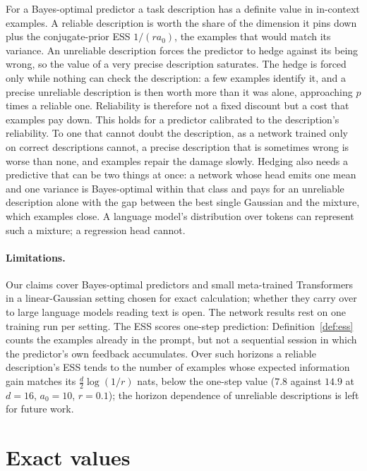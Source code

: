 \documentclass[10pt]{article}
\begin{document}
For a Bayes-optimal predictor a task description has a definite value in in-context examples. A reliable description is worth the share of the dimension it pins down plus the conjugate-prior ESS $1/(r a_0)$, the examples that would match its variance. An unreliable description forces the predictor to hedge against its being wrong, so the value of a very precise description saturates. The hedge is forced only while nothing can check the description: a few examples identify it, and a precise unreliable description is then worth more than it was alone, approaching $p$ times a reliable one. Reliability is therefore not a fixed discount but a cost that examples pay down. This holds for a predictor calibrated to the description's reliability. To one that cannot doubt the description, as a network trained only on correct descriptions cannot, a precise description that is sometimes wrong is worse than none, and examples repair the damage slowly. Hedging also needs a predictive that can be two things at once: a network whose head emits one mean and one variance is Bayes-optimal within that class and pays for an unreliable description alone with the gap between the best single Gaussian and the mixture, which examples close. A language model's distribution over tokens can represent such a mixture; a regression head cannot.

\paragraph{Limitations.}
Our claims cover Bayes-optimal predictors and small meta-trained Transformers in a linear-Gaussian setting chosen for exact calculation; whether they carry over to large language models reading text is open. The network results rest on one training run per setting. The ESS scores one-step prediction: Definition~\ref{def:ess} counts the examples already in the prompt, but not a sequential session in which the predictor's own feedback accumulates. Over such horizons a reliable description's ESS tends to the number of examples whose expected information gain matches its $\tfrac{d}{2}\log(1/r)$ nats, below the one-step value ($7.8$ against $14.9$ at $d = 16$, $a_0 = 10$, $r = 0.1$); the horizon dependence of unreliable descriptions is left for future work.




\clearpage
\appendix
\section{Exact values}\label{app:tables}
\end{document}
